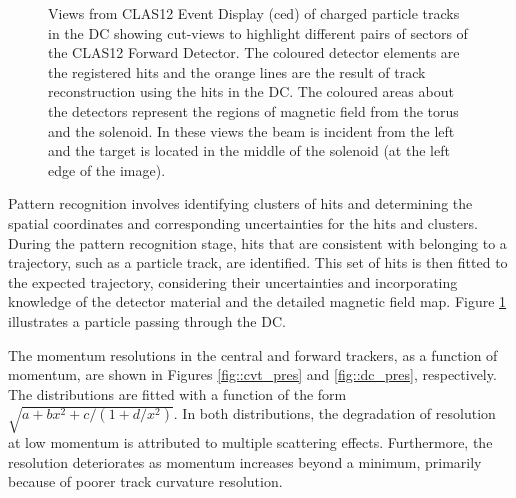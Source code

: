     \begin{figure}[t]
        \centering{}
        \caption[Particle going through DC.]{Views from CLAS12 Event Display (ced) of charged particle tracks in the DC showing cut-views to highlight different pairs of sectors of the CLAS12 Forward Detector.
        The coloured detector elements are the registered hits and the orange lines are the result of track reconstruction using the hits in the DC.
        The coloured areas about the detectors represent the regions of magnetic field from the torus and the solenoid.
        In these views the beam is incident from the left and the target is located in the middle of the solenoid (at the left edge of the image).}
        \label{fig::ced_event}
    \end{figure}
    Pattern recognition involves identifying clusters of hits and determining the spatial coordinates and corresponding uncertainties for the hits and clusters.
    During the pattern recognition stage, hits that are consistent with belonging to a trajectory, such as a particle track, are identified.
    This set of hits is then fitted to the expected trajectory, considering their uncertainties and incorporating knowledge of the detector material and the detailed magnetic field map.
    Figure \ref{fig::ced_event} illustrates a particle passing through the DC.

    The momentum resolutions in the central and forward trackers, as a function of momentum, are shown in Figures \ref{fig::cvt_pres} and \ref{fig::dc_pres}, respectively.
    The distributions are fitted with a function of the form $\sqrt{a + bx^2 + c/(1 + d/x^2)}$.
    In both distributions, the degradation of resolution at low momentum is attributed to multiple scattering effects.
    Furthermore, the resolution deteriorates as momentum increases beyond a minimum, primarily because of poorer track curvature resolution.

